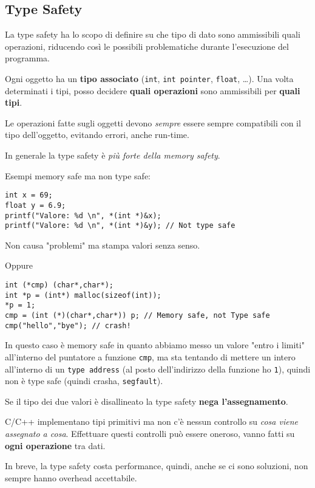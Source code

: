 
\subsection{Type Safety}

La type safety ha lo scopo di definire su che tipo di dato sono ammissibili quali operazioni, riducendo così le possibili problematiche durante l'esecuzione del programma.

Ogni oggetto ha un \textbf{tipo associato} (\texttt{int}, \texttt{int pointer}, \texttt{float}, \dots). Una volta determinati i tipi, posso decidere \textbf{quali operazioni} sono ammissibili per \textbf{quali tipi}. 

Le operazioni fatte sugli oggetti devono \textit{sempre} essere sempre compatibili con il tipo dell'oggetto, evitando errori, anche run-time.

In generale la type safety è \textit{più forte della memory safety}. 

\vfill

Esempi memory safe ma non type safe:
\begin{verbatim}
int x = 69;
float y = 6.9;
printf("Valore: %d \n", *(int *)&x);
printf("Valore: %d \n", *(int *)&y); // Not type safe
\end{verbatim}
Non causa "problemi" ma stampa valori senza senso.

Oppure
\begin{verbatim}
int (*cmp) (char*,char*);
int *p = (int*) malloc(sizeof(int));
*p = 1;
cmp = (int (*)(char*,char*)) p; // Memory safe, not Type safe
cmp("hello","bye"); // crash!
\end{verbatim}

In questo caso è memory safe in quanto abbiamo messo un valore "entro i limiti" all'interno del puntatore a funzione \texttt{cmp}, ma sta tentando di mettere un intero all'interno di un \texttt{type address} (al posto dell'indirizzo della funzione ho \texttt{1}), quindi non è type safe (quindi crasha, \texttt{segfault}). 

Se il tipo dei due valori è disallineato la type safety \textbf{nega l'assegnamento}.

C/C++ implementano tipi primitivi ma non c'è nessun controllo su \textit{cosa viene assegnato a cosa}. Effettuare questi controlli può essere oneroso, vanno fatti su \textbf{ogni operazione} tra dati. 

In breve, la type safety costa performance, quindi, anche se ci sono soluzioni, non sempre hanno overhead accettabile. 

